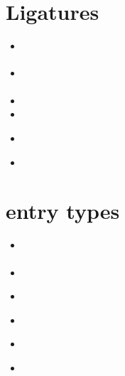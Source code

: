 \documentclass[a4paper,12pt,twoside]{scrartcl}
\begin{document}
\section{Ligatures}

\begin{itemize}
    \item\cite{test::firstnames::2}%
    \item\cite{test::firstnames::1}%
    \item{}%
    \item{}%
\end{itemize}

\begin{itemize}
    \item\cite{test::prefixnames::1}%
    \item{}%
\end{itemize}

\section{entry types}

\begin{itemize}
    \item\cite{hesse:c:1995}%
    \item{}
\end{itemize}

\begin{itemize}
    \item\cite{schaedler:1999}%
    \item{}%
    \item\cite{oberlechner:1999}%
    \item{}%
\end{itemize}
\end{document}
